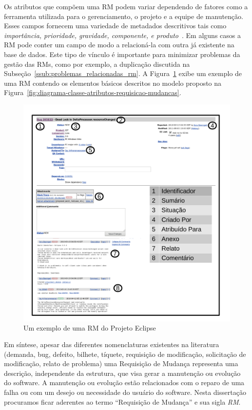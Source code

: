 Os atributos que compõem uma RM podem variar dependendo de fatores como a
ferramenta utilizada para o gerenciamento, o projeto e a equipe de manutenção.
Esses campos fornecem uma variedade de metadados descritivos tais como
\textit{importância, prioridade, gravidade, componente, e
    produto}~\cite{zhang2016literature}. Em alguns casos a RM pode conter um
campo de modo a relacioná-la com outra já existente na base de dados. Este tipo
de vínculo é importante para minimizar problemas da gestão das RMs, como por
exemplo, a duplicação discutida na
Subseção~\ref{ssub:problemas_relacionadas_rm}. A Figura~\ref{fig:rm-exemplo}
exibe um exemplo de uma RM contendo os elementos básicos descritos no modelo
proposto na Figura~\ref{fig:diagrama-classe-atributos-requisicao-mudancas}.

\begin{figure}[htpb]
	\centering
	\includegraphics[width=0.9\linewidth]{./chapter-manutencao-software-visao-geral/img/rm-exemplo.pdf}
	\caption{Um exemplo de uma RM do Projeto Eclipse}\label{fig:rm-exemplo}
\end{figure}

Em síntese, apesar das diferentes nomenclaturas existentes na literatura
(demanda, bug, defeito, bilhete, tíquete, requisição de modificação, solicitação
de modificação, relato de problema) uma Requisição de Mudança representa uma
descrição, independente da estrutura, que visa gerar a manutenção ou evolução do
software. A manutenção ou evolução estão relacionados com o reparo de uma falha
ou com um desejo ou necessidade do usuário do software. Nesta dissertação
procuramos ficar aderentes ao termo ``Requisição de Mudança'' e sua sigla
\textit{RM}.

